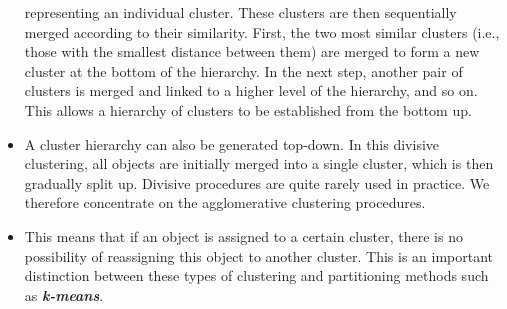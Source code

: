 \begin{itemize}
representing an individual cluster. These clusters are then sequentially merged
according to their similarity. First, the two most similar clusters (i.e., those with
the smallest distance between them) are merged to form a new cluster at the bottom
of the hierarchy. In the next step, another pair of clusters is merged and linked to a
higher level of the hierarchy, and so on. This allows a hierarchy of clusters to be
established from the bottom up.
\item A cluster hierarchy can also be generated top-down. In this divisive clustering,
all objects are initially merged into a single cluster, which is then gradually split up. Divisive procedures are quite rarely used in practice. We therefore
concentrate on the agglomerative clustering procedures.
\item This means that if an object is assigned
to a certain cluster, there is no possibility of reassigning this object to another
cluster. This is an important distinction between these types of clustering and
partitioning methods such as \textbf{\textit{k-means}}.
\end{itemize}
